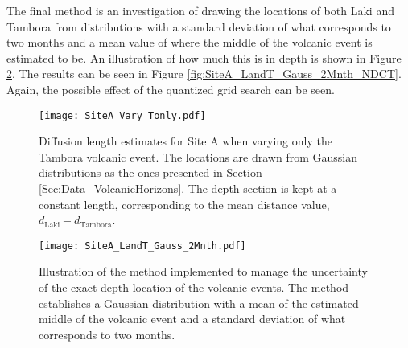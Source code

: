\documentclass[../../CompleteThesis2/Complete_2ndDraft]{subfiles}
\begin{document}
The final method is an investigation of drawing the locations of both Laki and Tambora from distributions with a standard deviation of what corresponds to two months and a mean value of where the middle of the volcanic event is estimated to be. An illustration of how much this is in depth is shown in Figure \ref{fig:SiteA_LandT_Gauss_2Mnth}. The results can be seen in Figure \ref{fig:SiteA_LandT_Gauss_2Mnth_NDCT}. Again, the possible effect of the quantized grid search can be seen.


\begin{figure}[!h]
	\centering
	\texttt{[image: SiteA\_Vary\_Tonly.pdf]}
	\caption[Diffusion Length Variations, Varying only Tambora]{\small Diffusion length estimates for Site A when varying only the Tambora volcanic event. The locations are drawn from Gaussian distributions as the ones presented in Section \ref{Sec:Data_VolcanicHorizons}. The depth section is kept at a constant length, corresponding to the mean distance value, $\bar{d}_{\text{Laki}}-\bar{d}_{\text{Tambora}}$.}
	\label{fig:SiteA_Vary_Lonly}
\end{figure}




\begin{figure}[!h]
	\centering
	\texttt{[image: SiteA\_LandT\_Gauss\_2Mnth.pdf]}
	\caption[Illustration of 2 Month Standard Deviation Variation of Volcanic Events Locations]{\small Illustration of the method implemented to manage the uncertainty of the exact depth location of the volcanic events. The method establishes a Gaussian distribution with a mean of the estimated middle of the volcanic event and a standard deviation of what corresponds to two months.}
	\label{fig:SiteA_LandT_Gauss_2Mnth}
\end{figure}

\end{document}
